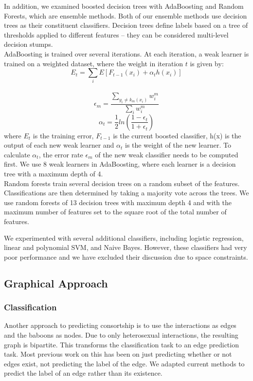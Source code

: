 \documentclass[twoside,twocolumn,paper=letter,fontsize=11pt]{article}
\begin{document}
In addition, we examined boosted decision trees with AdaBoosting and Random
Forests, which are ensemble methods. Both of our ensemble methods use decision
trees as their constituent classifiers. Decision trees define labels based on a
tree of thresholds applied to different features -- they can be considered multi-level decision stumps.\\

AdaBoosting is trained over several iterations. At each iteration, a weak
learner is trained on a weighted dataset, where the weight in iteration $t$ is
given by: $$E_t=\sum_i E[F_{t-1}(x_i) + \alpha_t h(x_i)]$$ \\
$$\epsilon_m = \frac{\sum_{y_i \ne k_m(x_i)} w_i^m}{\sum_i w_i^m}$$
$$\alpha_t=\frac{1}{2}ln(\frac{1-\epsilon_t}{1+\epsilon_t})$$ where $E_t$ is the training error, $F_{t-1}$ is the current boosted classifier, h(x) is the output of each new weak learner and $\alpha_t$ is the weight of the new learner. To calculate $\alpha_t$, the error rate $\epsilon_m$ of the new weak classifier needs to be computed first.
We use 8 weak learners in AdaBoosting, where each learner is a decision tree with a maximum depth of 4.\\

Random forests train several decision trees on a random subset of the features.
Classifications are then determined by taking a majority vote across the trees.
We use random forests of 13 decision trees with maximum depth 4 and with the
maximum number of features set to the square root of the total number of
features.

We experimented with several additional classifiers, including logistic
regression, linear and polynomial SVM, and Naive Bayes. However, these
classifiers had very poor performance and we have excluded their discussion due
to space constraints.

\subsection{Graphical Approach}

\subsubsection*{Classification}
Another approach to predicting consortship is to use the interactions as edges
and the baboons as nodes. Due to only heterosexual interactions, the resulting
graph is bipartite. This transforms the classification task to an edge
prediction task. Most previous work on this has been on just predicting whether
or not edges exist, not predicting the label of the edge. We adapted current
methods to predict the label of an edge rather than its existence.\\ 
\end{document}
